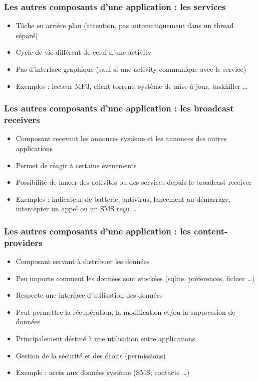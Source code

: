 \documentclass{beamer}
\begin{document}
\begin{frame}[fragile]
\frametitle{Les autres composants d'une application : les services}
\begin{itemize}
 \item Tâche en arrière plan (attention, pas automatiquement dans un thread séparé)
 \item Cycle de vie différent de celui d'une activity
 \item Pas d'interface graphique (sauf si une activity communique avec le
 service)
 \item Exemples : lecteur MP3, client torrent, système de mise à jour, taskkiller \ldots
 \end{itemize}
\end{frame}
\begin{frame}[fragile]
\frametitle{Les autres composants d'une application : les broadcast receivers}
\begin{itemize}
 \item Composant recevant les annonces système et les annonces des autres applications
 \item Permet de réagir à certains évenements
 \item Possibilité de lancer des activités ou des services depuis le broadcast receiver
 \item Exemples : indicateur de batterie, antivirus, lancement au démarrage,
 intercepter un appel ou un SMS reçu \ldots
 \end{itemize}
\end{frame}
\begin{frame}[fragile]
\frametitle{Les autres composants d'une application : les content-providers}
\begin{itemize}
  \item Composant servant à distribuer les données
  \item Peu importe comment les données sont stockées (sqlite, préferences, fichier \ldots)
  \item Respecte une interface d'utilisation des données
  \item Peut permettre la récupération, la modification et/ou la suppression de données
  \item Principalement déstiné à une utilisation entre applications
  \item Gestion de la sécurité et des droits (permissions)
  \item Exemple : accès aux données système (SMS, contacts \ldots) 
 \end{itemize}
\end{frame}
\end{document}
